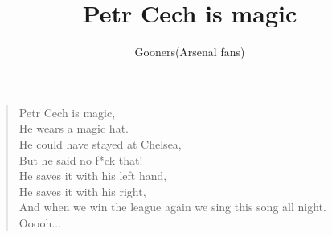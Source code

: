 \documentclass[a4paper,12pt]{article}
\title{Petr Cech is magic}
\author{Gooners(Arsenal fans)}
\date{}
\begin{document}
	
	\maketitle
	
	\begin{verse}
		
		Petr Cech is magic, \\
		He wears a magic hat. \\
		He could have stayed at Chelsea, \\ 
		But he said no f*ck that! \\
		He saves it with his left hand, \\ 
		He saves it with his right, \\
		And when we win the league again we sing this song all night. \\
		Ooooh$\ldots$
		
	\end{verse}
	
\end{document}
